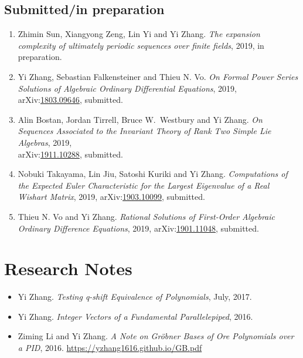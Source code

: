 \documentclass[a4paper,12pt]{article}
\begin{document}
\subsection*{Submitted/in preparation}
\begin{enumerate}
\item Zhimin Sun,  Xiangyong Zeng, Lin Yi and Yi Zhang. 
{\em The expansion complexity of ultimately periodic sequences over finite fields}, 2019, in preparation.
\item Yi Zhang, Sebastian Falkensteiner and Thieu N. Vo. 
{\em On Formal Power Series Solutions of Algebraic Ordinary
     Differential Equations}, 2019, arXiv:\href{https://arxiv.org/abs/1803.09646}{1803.09646}, submitted. 
\item Alin Bostan, Jordan Tirrell, Bruce W.\ Westbury and Yi Zhang. 
{\em On Sequences Associated to the Invariant Theory of Rank Two Simple Lie Algebras}, 2019, \\
 arXiv:\href{https://arxiv.org/abs/1911.10288}{1911.10288}, submitted. 
 \item Nobuki Takayama, Lin Jiu, Satoshi Kuriki and Yi Zhang. 
 {\em Computations of the Expected Euler Characteristic for the Largest Eigenvalue of a Real Wishart Matrix}, 2019, 
 arXiv:\href{http://arxiv.org/abs/1903.10099}{1903.10099}, submitted.
 \item Thieu N. Vo and Yi Zhang. 
{\em Rational Solutions of First-Order Algebraic Ordinary Difference Equations}, 2019, 
arXiv:\href{http://arxiv.org/abs/1901.11048}{1901.11048}, submitted.
\end{enumerate}

\section*{\Large{Research Notes}}
\begin{itemize}
\item Yi Zhang. {\em Testing q-shift Equivalence of Polynomials}, July, 2017.
\item Yi Zhang. {\em Integer Vectors of a Fundamental Parallelepiped}, 2016.
 \item Ziming Li and Yi Zhang. {\em A Note on Gr\"{o}bner Bases of Ore Polynomials over a PID}, 2016. 
 \url{https://yzhang1616.github.io/GB.pdf} 
\end{itemize}
\end{document}
